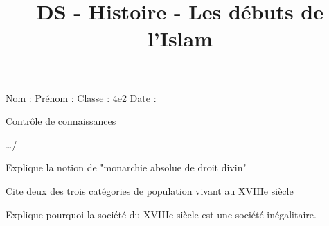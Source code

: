 \documentclass[12pt,a4paper]{exam}
\title{DS - Histoire - Les débuts de l'Islam}
\begin{document}
\begin{minipage}{19cm}
  Nom : \hspace{3cm}  Prénom : \hspace{3cm}   Classe : 4e2 \hspace{3cm}  Date : 
\end{minipage}
\hfill



\vspace{1cm}

\begin{center}

{\Large Contrôle de connaissances}

\vspace{0.5cm}
  \end{center}

 \hfill {\large …/\numpoints\ } %
 
 \begin{questions}
 \question[2] Explique la notion de "monarchie absolue de droit divin" \\
 
 
 \fillwithdottedlines{3cm}
 
 \begin{solution}
 \vspace{3cm}
 \end{solution}
 
 \question[1] Cite deux des trois catégories de population vivant au XVIIIe siècle
  \fillwithdottedlines{2cm}
   
   \begin{solution}
   \vspace{2cm}
   \end{solution}
  
   \question[2] Explique pourquoi la société du XVIIIe siècle est une société inégalitaire.
   \fillwithdottedlines{3cm}
      
      \begin{solution}
      \vspace{3cm}
      \end{solution}
 \end{questions}


 
 
\end{document}

